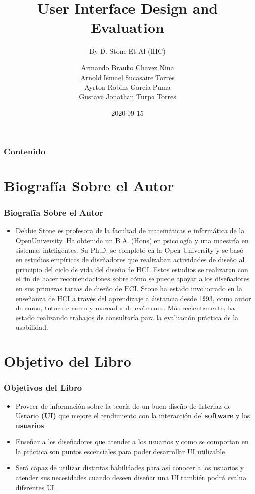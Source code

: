 \documentclass[11pt]{beamer}
\title[Presentación]{\bf\Huge User Interface Design and Evaluation}
\subtitle{By D. Stone Et Al (IHC)}
\author[asucasairet@unsa.edu.pe, achavezn@unsa.edu.pe, agarciapu@unsa.edu.pe, gturpoto@unsa.edu.pe]
{
	Armando Braulio Chavez Nina \inst{1} \\
	Arnold Ismael Sucasaire Torres \inst{2} \\
	Ayrton Robins Garcia Puma \inst{3} \\
	Gustavo Jonathan Turpo Torres \inst{4} 
}
\institute[UNSA]
{
\inst{1}%
System Engineering and Informatic Department\\
Production and Services Faculty\\
San Agustin National University of Arequipa
}
\date[2020-09-15]{\scriptsize{2020-09-15}}
\begin{document}
\begin{frame}
\titlepage
\end{frame}

\begin{frame}
\frametitle{Contenido}
\tableofcontents
\end{frame}

\section{Biografía Sobre el Autor}
\begin{frame}
\frametitle{Biografía Sobre el Autor}
\begin{itemize}
\item Debbie Stone es profesora de la facultad de matemáticas e informática de la OpenUniversity. Ha obtenido un B.A. (Hons) en psicología y una maestría en sistemas inteligentes. Su Ph.D. se completó en la Open University y se basó en estudios empíricos de diseñadores que realizaban actividades de diseño al principio del ciclo de vida del diseño de HCI. Estos estudios se realizaron con el fin de hacer recomendaciones sobre cómo se puede apoyar a los diseñadores en sus primeras tareas de diseño de HCI. Stone ha estado involucrado en la enseñanza de HCI a través del aprendizaje a distancia desde 1993, como autor de curso, tutor de curso y marcador de exámenes. Más recientemente, ha estado realizando trabajos de consultoría para la evaluación práctica de la usabilidad.
\end{itemize}
\end{frame}

\section{Objetivo del Libro}
\begin{frame}
\frametitle{Objetivos del Libro}
\begin{itemize}
\item Proveer de información sobre la teoría de un buen diseño de Interfaz de Usuario {\bf (UI)} que mejore el rendimiento con la interacción del {\bf software} y los {\bf usuarios}.
\end{itemize}
\begin{itemize}
\item Enseñar a los diseñadores que atender a los usuarios y como se comportan en la práctica son puntos escenciales para poder desarrollar UI utilizable.
\end{itemize}
\begin{itemize}
\item Será capaz de utilizar distintas habilidades para así conocer a los usuarios y atender sus necesidades cuando deseen diseñar una UI también podrá evalua diferentes UI.
\end{itemize}
\end{frame}
\end{document}
